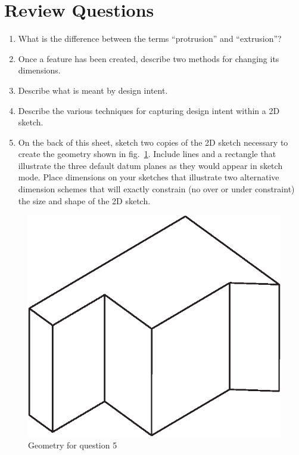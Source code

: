 \documentclass[12pt]{article}
\begin{document}
\section*{Review Questions}
\begin{enumerate}
	\item What is the difference between the terms ``protrusion'' and ``extrusion''?
	\pagebreak %
	\item Once a feature has been created, describe two methods for changing its dimensions.
	\vspace{1.25in}
	\item Describe what is meant by design intent.
	\vspace{1.25in}
	\item Describe the various techniques for capturing design intent within a 2D sketch.
	\vspace{1.25in}
	\item On the back of this sheet, sketch two copies of the 2D sketch necessary to create the geometry shown in fig.~\ref{figQuestion5}. Include lines and a rectangle that illustrate the three default datum planes as they would appear in sketch mode. Place dimensions on your sketches that illustrate two alternative dimension schemes that will exactly constrain (no over or under constraint) the size and shape of the 2D sketch.
\end{enumerate}

\begin{figure}[h!]
  \begin{center}
    \includegraphics[width=2.in]{mb_CS3_question5}
    \caption{Geometry for question 5}
    \label{figQuestion5}
  \end{center}
\end{figure}
\end{document}
